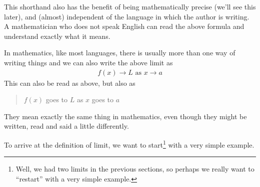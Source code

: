 This shorthand also has the benefit of being mathematically precise (we'll see
this later), and (almost) independent of the language in which the author is
writing. A mathematician who does not speak English can read the above formula
and understand exactly what it means.

In mathematics, like most languages, there is usually more than one way of
writing things and we can also write the above limit as
\begin{align*}
  f(x) \to L \mbox{ as } x \to a
\end{align*}
This can also be read as above, but also as
\begin{quote}
  $f(x)$ goes to $L$ as $x$ goes to $a$
\end{quote}
They mean exactly the same thing in mathematics, even though they might be
written, read and said a little differently.


To arrive at the definition of limit, we want to start\footnote{Well, we
had two limits in the previous sections, so perhaps we really want to
``restart'' with a very simple example.} with a very simple example.

